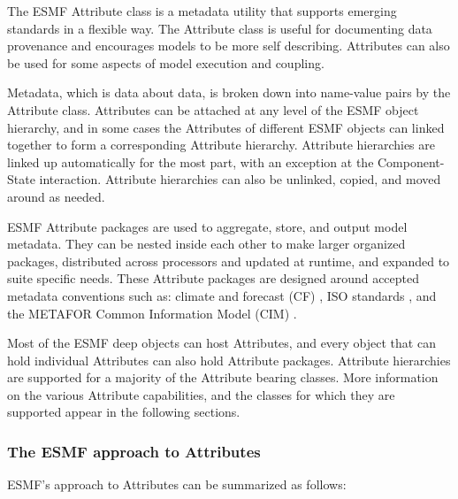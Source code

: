 %


The ESMF Attribute class is a metadata utility that supports emerging standards 
in a flexible way.  The Attribute class is useful for documenting data 
provenance and encourages models to be more self describing.  Attributes can 
also be used for some aspects of model execution and coupling.

Metadata, which is data about data, is broken down into 
name-value pairs by the Attribute class.  Attributes can be attached at any 
level of the ESMF object hierarchy, and in some cases the Attributes of 
different ESMF objects can linked together to form 
a corresponding Attribute hierarchy.  Attribute hierarchies are linked up
automatically for the most part, with an exception at the Component-State 
interaction.  Attribute hierarchies can also be unlinked, copied, and 
moved around as needed.

ESMF Attribute packages 
are used to aggregate, store, and output model metadata.  They can be 
nested inside each other to make larger organized packages, distributed across 
processors and updated at runtime, and expanded to suite specific needs.  These 
Attribute packages are designed around accepted metadata conventions such as: 
climate and forecast (CF) \cite{ref:cf}, ISO standards \cite{ref:iso}, and the METAFOR 
Common Information Model (CIM) \cite{ref:cim}.

Most of the ESMF deep objects can host Attributes, and   
every object that can hold individual Attributes can also hold
Attribute packages.  Attribute hierarchies are supported for a majority of
the Attribute bearing classes.  
More information on the various Attribute 
capabilities, and the classes for which they are supported appear in the
following sections.

\subsubsection{The ESMF approach to Attributes}

ESMF's approach to Attributes can be summarized as follows:

